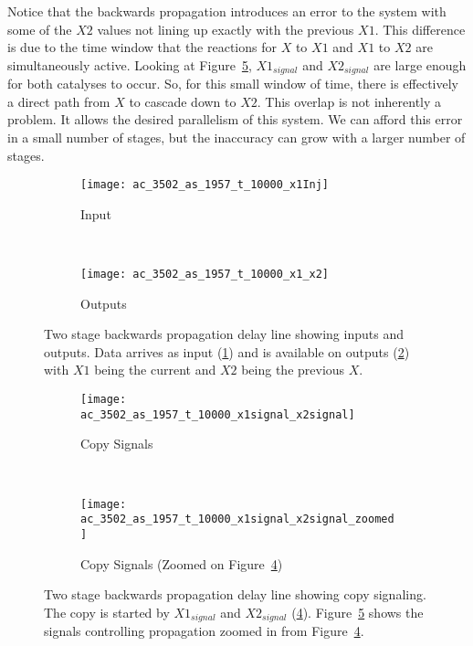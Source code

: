 Notice that the backwards propagation introduces an error to the system with some of the $X2$ values not lining up exactly with the previous $X1$. This difference is due to the time window that the reactions for $X$ to $X1$ and $X1$ to $X2$ are simultaneously active. Looking at Figure~\ref{fig:delay2X2SignalZoomed}, $X1_{signal}$ and $X2_{signal}$ are large enough for both catalyses to occur. So, for this small window of time, there is effectively a direct path from $X$ to cascade down to $X2$. This overlap is not inherently a problem. It allows the desired parallelism of this system. We can afford this error in a small number of stages, but the inaccuracy can grow with a larger number of stages.

\begin{figure}[ht]
	\centering
	\begin{subfigure}[b]{0.9\textwidth}
	    \centering
		\texttt{[image: ac\_3502\_as\_1957\_t\_10000\_x1Inj]}
		\caption{Input}
		\label{fig:delay2X}
		\vspace{15mm}
	\end{subfigure}
	\\
	\begin{subfigure}[b]{0.9\textwidth}
	    \centering
		\texttt{[image: ac\_3502\_as\_1957\_t\_10000\_x1\_x2]}
		\caption{Outputs}
		\label{fig:delay2X1}
	\end{subfigure}
	\caption[Two Stage Backwards Propagating Delay Line I/O]{Two stage backwards propagation delay line showing inputs and outputs. Data arrives as input (\ref{fig:delay2X}) and is available on outputs (\ref{fig:delay2X1}) with $X1$ being the current and $X2$ being the previous $X$.}
	\label{fig:delay2all_A}
\end{figure}

\begin{figure}[ht]
    \centering
	\begin{subfigure}[b]{0.9\textwidth}
	    \centering
		\texttt{[image: ac\_3502\_as\_1957\_t\_10000\_x1signal\_x2signal]}
		\caption{Copy Signals}
		\label{fig:delay2X2Signal}
		\vspace{15mm}
	\end{subfigure}
	\\
	\begin{subfigure}[b]{0.9\textwidth}
	    \centering
		\texttt{[image: ac\_3502\_as\_1957\_t\_10000\_x1signal\_x2signal\_zoomed]}
		\caption{Copy Signals (Zoomed on Figure~\ref{fig:delay2X2Signal})}
		\label{fig:delay2X2SignalZoomed}
	\end{subfigure}
	\caption[Two Stage Backwards Propagating Delay Line Signaling]{Two stage backwards propagation delay line showing copy signaling. The copy is started by $X1_{signal}$ and $X2_{signal}$ (\ref{fig:delay2X2Signal}). Figure~\ref{fig:delay2X2SignalZoomed} shows the signals controlling propagation zoomed in from Figure~\ref{fig:delay2X2Signal}.}
	\label{fig:delay2all_B}
\end{figure}

